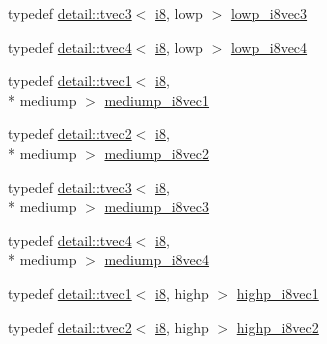 \begin{DoxyCompactItemize}
\item 
typedef \hyperlink{structglm_1_1detail_1_1tvec3}{detail\-::tvec3}$<$ \hyperlink{group__gtc__type__precision_gaae064be68b7d36cd7910c16e8ad18bba}{i8}, lowp $>$ \hyperlink{group__gtc__type__precision_ga048811f03c327d4b56564a72d98800e8}{lowp\-\_\-i8vec3}
\item 
typedef \hyperlink{structglm_1_1detail_1_1tvec4}{detail\-::tvec4}$<$ \hyperlink{group__gtc__type__precision_gaae064be68b7d36cd7910c16e8ad18bba}{i8}, lowp $>$ \hyperlink{group__gtc__type__precision_ga095202095a1fefbdae4a974c3b750223}{lowp\-\_\-i8vec4}
\item 
typedef \hyperlink{structglm_1_1detail_1_1tvec1}{detail\-::tvec1}$<$ \hyperlink{group__gtc__type__precision_gaae064be68b7d36cd7910c16e8ad18bba}{i8}, \\*
mediump $>$ \hyperlink{group__gtc__type__precision_ga820f8b497e06d518968d00761747c547}{mediump\-\_\-i8vec1}
\item 
typedef \hyperlink{structglm_1_1detail_1_1tvec2}{detail\-::tvec2}$<$ \hyperlink{group__gtc__type__precision_gaae064be68b7d36cd7910c16e8ad18bba}{i8}, \\*
mediump $>$ \hyperlink{group__gtc__type__precision_ga38eba1ab306fe5cc5eeafa35ce5b5b26}{mediump\-\_\-i8vec2}
\item 
typedef \hyperlink{structglm_1_1detail_1_1tvec3}{detail\-::tvec3}$<$ \hyperlink{group__gtc__type__precision_gaae064be68b7d36cd7910c16e8ad18bba}{i8}, \\*
mediump $>$ \hyperlink{group__gtc__type__precision_ga91b40a693c1db26a7cc544339b326df3}{mediump\-\_\-i8vec3}
\item 
typedef \hyperlink{structglm_1_1detail_1_1tvec4}{detail\-::tvec4}$<$ \hyperlink{group__gtc__type__precision_gaae064be68b7d36cd7910c16e8ad18bba}{i8}, \\*
mediump $>$ \hyperlink{group__gtc__type__precision_gad41bf4bfa504dc1191623ff77151d01f}{mediump\-\_\-i8vec4}
\item 
typedef \hyperlink{structglm_1_1detail_1_1tvec1}{detail\-::tvec1}$<$ \hyperlink{group__gtc__type__precision_gaae064be68b7d36cd7910c16e8ad18bba}{i8}, highp $>$ \hyperlink{group__gtc__type__precision_ga0334353753f93388bcc89f91c9aff476}{highp\-\_\-i8vec1}
\item 
typedef \hyperlink{structglm_1_1detail_1_1tvec2}{detail\-::tvec2}$<$ \hyperlink{group__gtc__type__precision_gaae064be68b7d36cd7910c16e8ad18bba}{i8}, highp $>$ \hyperlink{group__gtc__type__precision_ga2224945795a870e41d951f0847d54f02}{highp\-\_\-i8vec2}
\item 

\end{DoxyCompactItemize}
